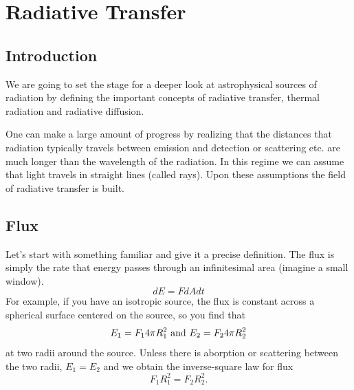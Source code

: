 \chapter{Radiative Transfer}
\label{cha:radiative-transfer}

\section{Introduction}
\label{sec:introduction}

We are going to set the stage for a deeper look at astrophysical
sources of radiation by defining the important concepts of radiative
transfer, thermal radiation and radiative diffusion.

One can make a large amount of progress by realizing that the
distances that radiation typically travels between emission and
detection or scattering etc. are much longer than the wavelength of
the radiation.  In this regime we can assume that light travels in
straight lines (called rays).  Upon these assumptions the field of
radiative transfer is built.

\section{Flux}
\label{sec:flux}
Let's start with something familiar and give it a precise definition.
The flux is simply the rate that energy passes through an
infinitesimal area (imagine a small window).
\begin{equation}
dE = F d\!A dt
\label{eq:1}
\end{equation}
For example, if you have an isotropic source, 
the flux is constant across a spherical surface centered on the
source, so you find that
\begin{equation}
E_1=F_1 4 \pi R_1^2 ~\mbox{\rm and}~
E_2=F_2 4 \pi R_2^2 
\label{eq:2}
\end{equation}
at two radii around the source.   Unless there is aborption or scattering 
between the two radii, $E_1=E_2$ and we obtain the inverse-square law 
for flux
\begin{equation}
F_1 R_1^2 = F_2 R_2^2.
\label{eq:3}
\end{equation}

